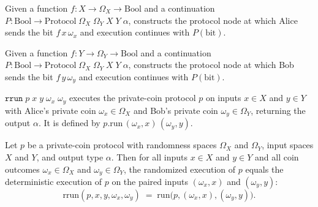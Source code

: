 \begin{definition}
\label{CommunicationComplexity.PrivateCoin.Protocol.alice}
\leanok
{}
Given a function $f : X \to \Omega_X \to \mathrm{Bool}$ and a continuation
$P : \mathrm{Bool} \to \mathrm{Protocol}\;\Omega_X\;\Omega_Y\;X\;Y\;\alpha$, constructs
the protocol node at which Alice sends the bit $f\,x\,\omega_x$ and execution
continues with $P(\text{bit})$.
\end{definition}

\begin{definition}
\label{CommunicationComplexity.PrivateCoin.Protocol.bob}
\leanok
{}
Given a function $f : Y \to \Omega_Y \to \mathrm{Bool}$ and a continuation
$P : \mathrm{Bool} \to \mathrm{Protocol}\;\Omega_X\;\Omega_Y\;X\;Y\;\alpha$, constructs
the protocol node at which Bob sends the bit $f\,y\,\omega_y$ and execution continues
with $P(\text{bit})$.
\end{definition}

\begin{definition}
\label{CommunicationComplexity.PrivateCoin.Protocol.rrun}
\leanok
{}
$\texttt{rrun}\;p\;x\;y\;\omega_x\;\omega_y$ executes the private-coin protocol $p$ on
inputs $x \in X$ and $y \in Y$ with Alice's private coin $\omega_x \in \Omega_X$ and
Bob's private coin $\omega_y \in \Omega_Y$, returning the output $\alpha$.  It is
defined by $p.\mathrm{run}\,(\omega_x, x)\,(\omega_y, y)$.
\end{definition}

\begin{theorem}
\label{CommunicationComplexity.PrivateCoin.Protocol.rrun_eq}
\leanok
{}
Let $p$ be a private-coin protocol with randomness spaces $\Omega_X$ and $\Omega_Y$,
input spaces $X$ and $Y$, and output type $\alpha$. Then for all inputs $x \in X$ and $y
\in Y$ and all coin outcomes $\omega_x \in \Omega_X$ and $\omega_y \in \Omega_Y$, the
randomized execution of $p$ equals the deterministic execution of $p$ on the paired
inputs $(\omega_x, x)$ and $(\omega_y, y)$:
\[
\mathrm{rrun}(p, x, y, \omega_x, \omega_y) \;=\; \mathrm{run}\bigl(p, (\omega_x, x),
(\omega_y, y)\bigr).
\]
\end{theorem}

